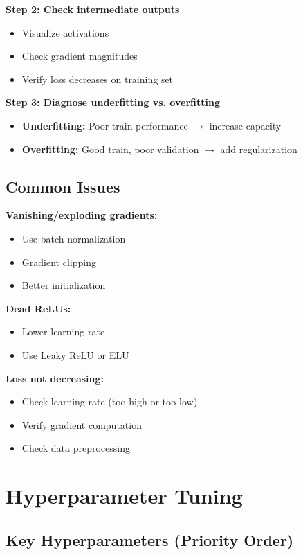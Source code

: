 \textbf{Step 2: Check intermediate outputs}
\begin{itemize}
    \item Visualize activations
    \item Check gradient magnitudes
    \item Verify loss decreases on training set
\end{itemize}

\textbf{Step 3: Diagnose underfitting vs. overfitting}
\begin{itemize}
    \item \textbf{Underfitting:} Poor train performance $\to$ increase capacity
    \item \textbf{Overfitting:} Good train, poor validation $\to$ add regularization
\end{itemize}

\subsection{Common Issues}

\textbf{Vanishing/exploding gradients:}
\begin{itemize}
    \item Use batch normalization
    \item Gradient clipping
    \item Better initialization
\end{itemize}

\textbf{Dead ReLUs:}
\begin{itemize}
    \item Lower learning rate
    \item Use Leaky ReLU or ELU
\end{itemize}

\textbf{Loss not decreasing:}
\begin{itemize}
    \item Check learning rate (too high or too low)
    \item Verify gradient computation
    \item Check data preprocessing
\end{itemize}

\section{Hyperparameter Tuning}
\label{sec:hyperparameter-tuning}

\subsection{Key Hyperparameters (Priority Order)}

